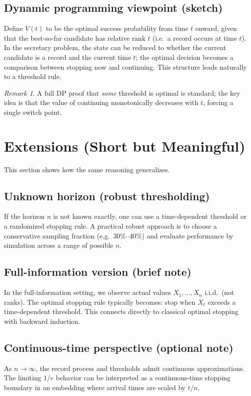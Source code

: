 \documentclass[11pt]{article}
\theoremstyle{plain}
\theoremstyle{definition}
\theoremstyle{remark}
\newtheorem{remark}[theorem]{Remark}
\newcommand{\1}{\mathbf{1}}
\begin{document}
\subsection{Dynamic programming viewpoint (sketch)}
Define $V(t)$ to be the optimal success probability from time $t$ onward, given that the best-so-far
candidate has relative rank $t$ (i.e.\ a record occurs at time $t$). In the secretary problem, the state can
be reduced to whether the current candidate is a record and the current time $t$; the optimal decision becomes
a comparison between stopping now and continuing. This structure leads naturally to a threshold rule.

\begin{remark}
A full DP proof that \emph{some} threshold is optimal is standard; the key idea is that the value of continuing
monotonically decreases with $t$, forcing a single switch point.
\end{remark}

\section{Extensions (Short but Meaningful)}
This section shows how the same reasoning generalizes.

\subsection{Unknown horizon (robust thresholding)}
If the horizon $n$ is not known exactly, one can use a time-dependent threshold or a randomized stopping rule.
A practical robust approach is to choose a conservative sampling fraction (e.g.\ $30\%$--$40\%$) and evaluate
performance by simulation across a range of possible $n$.

\subsection{Full-information version (brief note)}
In the full-information setting, we observe actual values $X_1,\dots,X_n$ i.i.d.\ (not ranks).
The optimal stopping rule typically becomes: stop when $X_t$ exceeds a time-dependent threshold.
This connects directly to classical optimal stopping with backward induction.

\subsection{Continuous-time perspective (optional note)}
As $n\to\infty$, the record process and thresholds admit continuous approximations. The limiting $1/e$ behavior
can be interpreted as a continuous-time stopping boundary in an embedding where arrival times are scaled by $t/n$.
\end{document}
